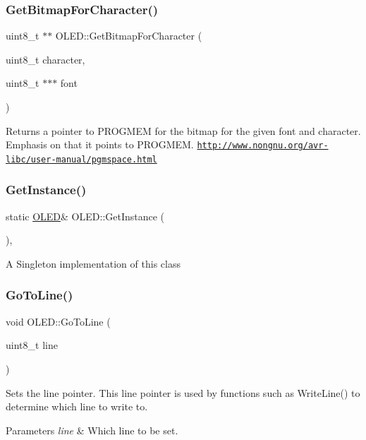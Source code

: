 \subsubsection{\texorpdfstring{Get\+Bitmap\+For\+Character()}{GetBitmapForCharacter()}}
{\footnotesize\ttfamily uint8\+\_\+t $\ast$$\ast$ O\+L\+E\+D\+::\+Get\+Bitmap\+For\+Character (\begin{DoxyParamCaption}\item[{uint8\+\_\+t}]{character,  }\item[{uint8\+\_\+t $\ast$$\ast$$\ast$}]{font }\end{DoxyParamCaption})}

Returns a pointer to P\+R\+O\+G\+M\+EM for the bitmap for the given font and character. Emphasis on that it points to P\+R\+O\+G\+M\+EM. \href{http://www.nongnu.org/avr-libc/user-manual/pgmspace.html}{\tt http\+://www.\+nongnu.\+org/avr-\/libc/user-\/manual/pgmspace.\+html} \hypertarget{class_o_l_e_d_a7b261492679b5e67d346e97ed575332e}{}\label{class_o_l_e_d_a7b261492679b5e67d346e97ed575332e} 
\subsubsection{\texorpdfstring{Get\+Instance()}{GetInstance()}}
{\footnotesize\ttfamily static \hyperlink{class_o_l_e_d}{O\+L\+ED}\& O\+L\+E\+D\+::\+Get\+Instance (\begin{DoxyParamCaption}{ }\end{DoxyParamCaption})\hspace{0.3cm}{\ttfamily [inline]}, {\ttfamily [static]}}

A Singleton implementation of this class \hypertarget{class_o_l_e_d_a8d314130676b104ed959b92ab4bac25e}{}\label{class_o_l_e_d_a8d314130676b104ed959b92ab4bac25e} 
\subsubsection{\texorpdfstring{Go\+To\+Line()}{GoToLine()}}
{\footnotesize\ttfamily void O\+L\+E\+D\+::\+Go\+To\+Line (\begin{DoxyParamCaption}\item[{uint8\+\_\+t}]{line }\end{DoxyParamCaption})}

Sets the line pointer. This line pointer is used by functions such as Write\+Line() to determine which line to write to. 
\begin{DoxyParams}{Parameters}
{\em line} & Which line to be set. \\
\hline
\end{DoxyParams}
\hypertarget{class_o_l_e_d_a2c8205c8eac9d7a2b181657561e9b4d2}{}\label{class_o_l_e_d_a2c8205c8eac9d7a2b181657561e9b4d2} 
